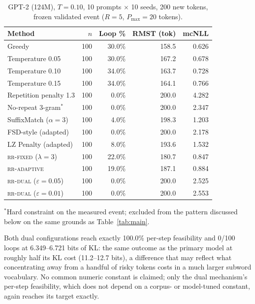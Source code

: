\documentclass[make,article,submit,pdftex]{Definitions/mdpi}
\begin{document}
\begin{table}[H]
\centering
\caption{GPT-2 (124M), $T{=}0.10$, 10 prompts $\times$ 10 seeds, 200 new tokens, frozen validated event ($R{=}5$, $P_{\max}{=}20$ tokens).}
\label{tab:gpt2full}
\begin{tabular}{@{}lrrrr@{}}
\toprule
Method & $n$ & Loop \% & RMST (tok) & mcNLL \\
\midrule
Greedy                      & 100 & 30.0\% & 158.5 & 0.626 \\
Temperature 0.05             & 100 & 30.0\% & 167.2 & 0.678 \\
Temperature 0.10             & 100 & 34.0\% & 163.7 & 0.728 \\
Temperature 0.15             & 100 & 34.0\% & 164.1 & 0.766 \\
Repetition penalty 1.3        & 100 & 0.0\%  & 200.0 & 4.282 \\
No-repeat 3-gram$^{*}$       & 100 & 0.0\%  & 200.0 & 2.347 \\
SuffixMatch ($\alpha{=}3$)    & 100 & 4.0\%  & 198.3 & 1.203 \\
FSD-style (adapted)          & 100 & 0.0\%  & 200.0 & 2.178 \\
LZ Penalty (adapted)        & 100 & 8.0\%  & 193.6 & 1.532 \\
\textsc{rr-fixed} ($\lambda{=}3$)   & 100 & 22.0\% & 180.7 & 0.847 \\
\textsc{rr-adaptive}          & 100 & 19.0\% & 187.1 & 0.884 \\
\textsc{rr-dual} ($\varepsilon{=}0.05$) & 100 & 0.0\% & 200.0 & 2.525 \\
\textsc{rr-dual} ($\varepsilon{=}0.01$) & 100 & 0.0\% & 200.0 & 2.553 \\
\bottomrule
\end{tabular}

\vspace{4pt}
{\footnotesize $^{*}$Hard constraint on the measured event; excluded from the pattern discussed below on the same grounds as Table~\ref{tab:main}.}
\end{table}

Both dual configurations reach exactly 100.0\% per-step feasibility and 0/100 loops at 6.349--6.721 bits of KL: the same outcome as the primary model at roughly half its KL cost (11.2--12.7 bits), a difference that may reflect what concentrating away from a handful of risky tokens costs in a much larger subword vocabulary. No common numeric constant is claimed; only the dual mechanism's per-step feasibility, which does not depend on a corpus- or model-tuned constant, again reaches its target exactly.
\end{document}
